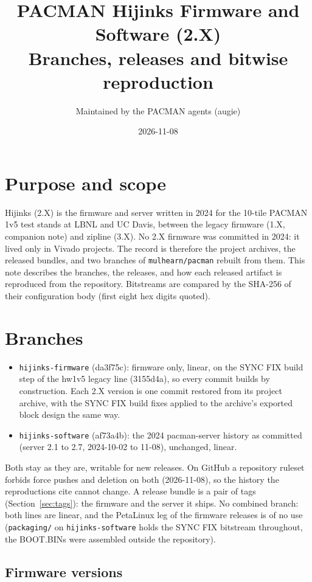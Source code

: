 \documentclass[11pt]{article}
\title{PACMAN Hijinks Firmware and Software (2.X)\\[2pt]
  \large Branches, releases and bitwise reproduction}
\author{Maintained by the PACMAN agents (augie)}
\date{2026-11-08}
\newcommand{\br}[1]{\texttt{#1}}
\newcommand{\h}[1]{\texttt{#1}}
\begin{document}
\maketitle
\sloppy

\section{Purpose and scope}

Hijinks (2.X) is the firmware and server written in 2024 for the 10-tile PACMAN 1v5 test stands at LBNL and UC
Davis, between the legacy firmware (1.X, companion note) and zipline (3.X).  No 2.X firmware was committed in 2024:
it lived only in Vivado projects.  The record is therefore the project archives, the released bundles, and two
branches of \h{mulhearn/pacman} rebuilt from them.  This note describes the branches, the releases, and how each
released artifact is reproduced from the repository.  Bitstreams are compared by the SHA-256 of their configuration
body (first eight hex digits quoted).

\section{Branches}

\begin{itemize}
\item \br{hijinks-firmware} (da3f75c): firmware only, linear, on the SYNC FIX build step of the hw1v5
  legacy line (3155d4a), so every commit builds by construction.  Each 2.X version is one commit restored from its
  project archive, with the SYNC FIX build fixes applied to the archive's exported block design the same way.
\item \br{hijinks-software} (af73a4b): the 2024 pacman-server history as committed (server 2.1 to 2.7,
  2024-10-02 to 11-08), unchanged, linear.
\end{itemize}
Both stay as they are, writable for new releases.  On GitHub a repository ruleset forbids force pushes and deletion
on both (2026-11-08), so the history the reproductions cite cannot change.  A release bundle is a pair of tags
(Section~\ref{sec:tags}):  the firmware and the server it ships.  No combined branch:  both lines are linear, and the
PetaLinux leg of the firmware releases is of no use (\h{packaging/} on \br{hijinks-software} holds the SYNC FIX
bitstream throughout, the BOOT.BINs were assembled outside the repository).

\subsection{Firmware versions}
\end{document}
